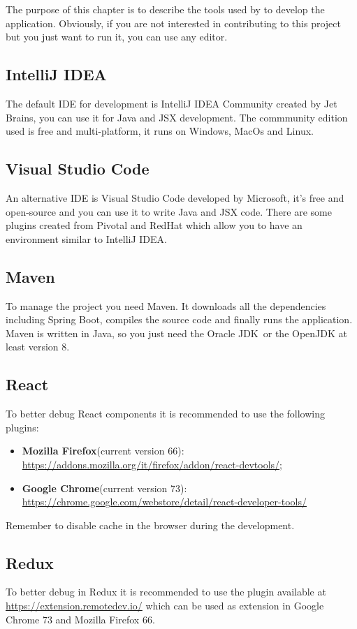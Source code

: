 The purpose of this chapter is to describe the tools used by \gruppo{} to develop the application.
Obviously, if you are not interested in contributing to this project but you just want to run it, you can use any editor.
\subsection{IntelliJ IDEA}
The default IDE for development is IntelliJ IDEA Community created by Jet Brains, you can use it for Java and JSX development. The commmunity edition used is free and multi-platform, it runs on Windows, MacOs and Linux.

\subsection{Visual Studio Code}
An alternative IDE is Visual Studio Code developed by Microsoft, it's free and open-source and you can use it to write Java and JSX code. There are some plugins created from Pivotal and RedHat which allow you to have an environment similar to IntelliJ IDEA.

\subsection{Maven}
To manage the project you need Maven. It downloads all the dependencies including Spring Boot, compiles the source code and finally runs the application. Maven is written in Java, so you just need the {Oracle JDK}\ or the OpenJDK at least version 8.

\subsection{React}
To better debug React components it is recommended to use the following plugins:
\begin{itemize}
\item \textbf{Mozilla Firefox}(current version 66): \\
\url{https://addons.mozilla.org/it/firefox/addon/react-devtools/};
\item \textbf{Google Chrome}(current version 73): \\
\href{https://chrome.google.com/webstore/detail/react-developer-tools/fmkadmapgofadopljbjfkapdkoienihi}{https://chrome.google.com/webstore/detail/react-developer-tools/}
\end{itemize}
Remember to disable cache in the browser during the development.

\subsection{Redux}
To better debug in Redux it is recommended to use the plugin available at\\ \url{https://extension.remotedev.io/} which can be used as extension in Google Chrome 73 and Mozilla Firefox 66.

 
